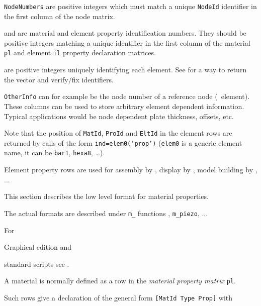 \begin{Eitem}
\item {\tt NodeNumbers} are positive integers which must match a unique {\tt NodeId} identifier in the first column of the node matrix.

\item {} and  are material and element property identification numbers. They should be positive integers matching a unique identifier in the first column of the material {\tt pl} and element {\tt il} property declaration matrices.

\item {} are positive integers uniquely identifying each element. See  for a way to return the vector and verify/fix identifiers.


\item{\tt OtherInfo} can for example be the node number of a reference node (\beam\ element). These columns can be used to store arbitrary element dependent information. Typical applications would be node dependent plate thickness, offsets, etc.


\end{Eitem}

 Note that the position of {\tt MatId}, {\tt ProId} and {\tt EltId} in the element rows are returned by calls of the form {\tt ind=elem0('prop')} ({\tt elem0} is a generic element name, it can be {\tt bar1}, {\tt hexa8}, \ldots).

\noindent Element property rows are used for assembly by \femk, display by \feplot, model building by \femesh, ...



This section describes the low level format for material properties. 

The actual formats are described under {\tt m\_} functions \melastic, {\tt m\_piezo}, ... 

For \begin{SDT} Graphical edition and \end{SDT} standard scripts see .

A material is normally defined as a row in the {\sl material property matrix} {\tt pl}. 

Such rows give a declaration of the general form {\tt [MatId Type Prop]} with

